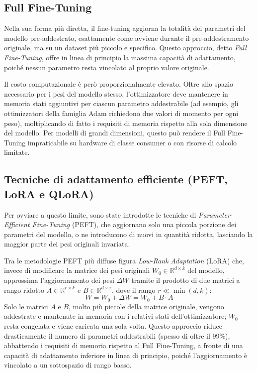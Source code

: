 \documentclass[12pt,a4paper,openright,twoside]{book}
\begin{document}
\subsection{Full Fine-Tuning}
Nella sua forma più diretta, il fine-tuning aggiorna la totalità dei parametri
del modello pre-addestrato, esattamente come avviene durante il
pre-addestramento originale, ma su un dataset più piccolo e specifico. Questo
approccio, detto \textit{Full Fine-Tuning}, offre in linea di principio la
massima capacità di adattamento, poiché nessun parametro resta vincolato al
proprio valore originale.

Il costo computazionale è però proporzionalmente elevato. Oltre allo spazio
necessario per i pesi del modello stesso, l'ottimizzatore deve mantenere in
memoria stati aggiuntivi per ciascun parametro addestrabile (ad esempio, gli
ottimizzatori della famiglia Adam richiedono due valori di momento per ogni
peso), moltiplicando di fatto i requisiti di memoria rispetto alla sola
dimensione del modello. Per modelli di grandi dimensioni, questo può rendere il
Full Fine-Tuning impraticabile su hardware di classe consumer o con risorse di
calcolo limitate.

\subsection{Tecniche di adattamento efficiente (PEFT, LoRA e QLoRA)}
\label{sec:peft-lora}
Per ovviare a questo limite, sono state introdotte le tecniche di
\textit{Parameter-Efficient Fine-Tuning} (PEFT), che aggiornano solo una piccola
porzione dei parametri del modello, o ne introducono di nuovi in quantità
ridotta, lasciando la maggior parte dei pesi originali invariata.

Tra le metodologie PEFT più diffuse figura \textit{Low-Rank Adaptation} (LoRA)
\cite{hu2021lora} che, invece di modificare la matrice dei pesi originali $W_0
    \in \mathbb{R}^{d \times k}$ del modello, approssima l'aggiornamento dei pesi
$\Delta W$ tramite il prodotto di due matrici a rango ridotto $A \in
    \mathbb{R}^{r \times k}$ e $B \in \mathbb{R}^{d \times r}$, dove il rango $r \ll
    \min(d, k)$:
\[
    W = W_0 + \Delta W = W_0 + B \cdot A
\]
Solo le matrici $A$ e $B$, molto più piccole della matrice originale, vengono
addestrate e mantenute in memoria con i relativi stati dell'ottimizzatore; $W_0$
resta congelata e viene caricata una sola volta. Questo approccio riduce
drasticamente il numero di parametri addestrabili (spesso di oltre il 99\%),
abbattendo i requisiti di memoria rispetto al Full Fine-Tuning, a fronte di una
capacità di adattamento inferiore in linea di principio, poiché l'aggiornamento
è vincolato a un sottospazio di rango basso.
\end{document}
